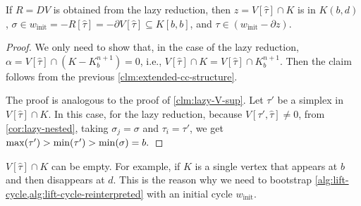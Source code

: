 \documentclass[cleveref,a4paper,english,nolineno]{socg-lipics-v2021}
\newcommand{\cone}[1]{\hat{#1}}
\newcommand{\bdry}{\partial}
\newcommand{\supK}[1]{K_{#1}^{n+1}}
\newcommand{\ssx}{\sigma}
\newcommand{\tsx}{\tau}
\newcommand{\ctsx}{\cone{\tsx}}
\newcommand{\winit}{w_\textrm{init}}
\begin{document}
    \begin{claim}
        If $R=DV$ is obtained from the lazy reduction, then
        $z = V[\ctsx] \cap K$ is in $K(b,d)$, $\ssx \in \winit = -R[\ctsx] = -\bdry V[\ctsx] \subseteq K[b,b]$,
        and $\tsx \in \left( \winit - \bdry z \right)$.
    \end{claim}
    \begin{proof}
        We only need to show that, in the case of the lazy reduction,
        $\alpha = V[\ctsx] \cap (K - \supK{b}) = 0$,
        i.e., $V[\ctsx] \cap K = V[\ctsx] \cap \supK{b}$.
        Then the claim follows from the previous \cref{clm:extended-cc-structure}.

        The proof is analogous to the proof of \cref{clm:lazy-V-sup}.
        Let $\tsx'$ be a simplex in $V[\ctsx] \cap K$. In this case,
        for the lazy reduction, because $V[\tsx', \ctsx] \neq 0$, from
        \cref{cor:lazy-nested}, taking
        $\ssx_j = \ssx$ and $\tsx_i = \tsx'$, we get
        $
            \max(\tsx') > \min(\tsx') > \min(\ssx) = b.
            \qedhere
        $
    \end{proof}

    \begin{remark}
        $V[\ctsx] \cap K$ can be empty.
        For example, if $K$ is a single vertex that appears at $b$ and then disappears at $d$.
        This is the reason why we need to bootstrap \cref{alg:lift-cycle,alg:lift-cycle-reinterpreted} with
        an initial cycle $\winit$.
    \end{remark}
\end{document}
